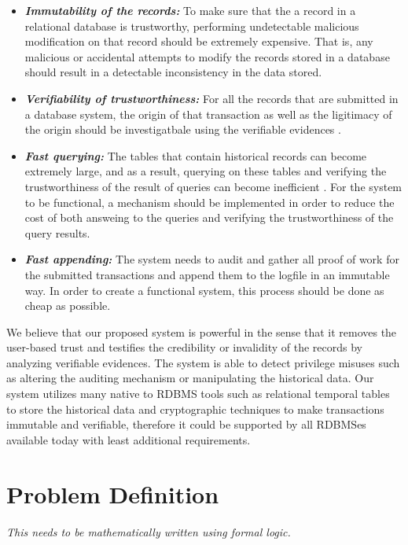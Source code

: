 		\begin{itemize}
			  \item \textbf{\textit{Immutability of the records:}} To make sure that the a record in a relational database is trustworthy, performing undetectable malicious modification on that record should be extremely expensive. That is, any malicious or accidental attempts to modify the records stored in a database should result in a detectable inconsistency in the data stored.

			  \item \textbf{\textit{Verifiability of trustworthiness:}} For all the records that are submitted in a database system, the origin of that transaction as well as the ligitimacy of the origin should be investigatbale using the verifiable evidences .

			  \item \textbf{\textit{Fast querying:}} The tables that contain historical records can become extremely large, and as a result, querying on these tables and verifying the trustworthiness of the result of queries can become inefficient \cite{crosby2009tamper-evident}\cite{beirami2018snapshot}. For the system to be functional, a mechanism should be implemented in order to reduce the cost of both answeing to the queries and verifying the trustworthiness of the query results.

			  \item \textbf{\textit{Fast appending:}} The system needs to audit and gather all proof of work for the submitted transactions and append them to the logfile in an immutable way. In order to create a functional system, this process should be done as cheap as possible.
	\end{itemize}

		We believe that our proposed system is powerful in the sense that it removes the user-based trust and testifies the credibility or invalidity of the records by analyzing verifiable evidences. The system is able to detect privilege misuses such as altering the auditing mechanism or manipulating the historical data. Our system utilizes many native to RDBMS tools such as relational temporal tables to store the historical data and cryptographic techniques to make transactions immutable and verifiable, therefore it could be supported by all RDBMSes available today with least additional requirements.

	\section{Problem Definition} \label{sec:problem_definition}

	{\it This needs to be mathematically written using formal logic.}
